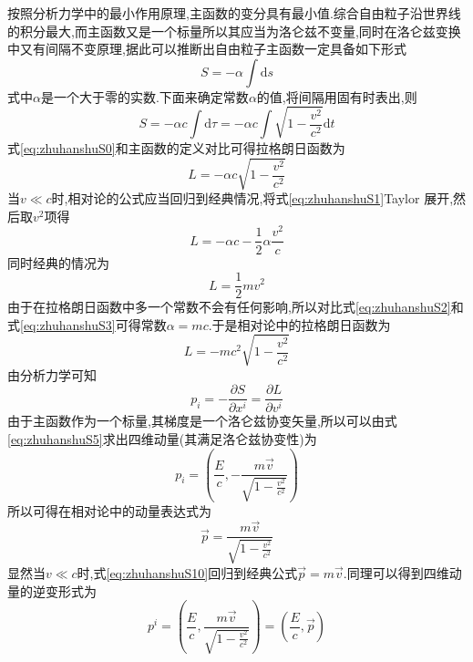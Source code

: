 按照分析力学中的最小作用原理,主函数的变分具有最小值.综合自由粒子沿世界线的积分最大,而主函数又是一个标量所以其应当为洛仑兹不变量,同时在洛仑兹变换中又有间隔不变原理,据此可以推断出自由粒子主函数一定具备如下形式
\begin{equation}
  S=-\alpha \int \mathrm{d}s
  \label{eq:zhuhanshuS}
\end{equation}
式中$\alpha$是一个大于零的实数.下面来确定常数$\alpha$的值,将间隔用固有时表出,则
\begin{equation}
  S=-\alpha c \int \mathrm{d}\tau =-\alpha c \int \sqrt{1-\frac{v^2}{c^2}} \mathrm{d}t
  \label{eq:zhuhanshuS0}
\end{equation}
式\eqref{eq:zhuhanshuS0}和主函数的定义对比可得拉格朗日函数为
\begin{equation}
  L=-\alpha c \sqrt{1-\frac{v^2}{c^2}}
  \label{eq:zhuhanshuS1}
\end{equation}
当$v \ll c$时,相对论的公式应当回归到经典情况,将式\eqref{eq:zhuhanshuS1}Taylor 展开,然后取$v^2$项得
\begin{equation}
  L=-\alpha c -\frac{1}{2}\alpha \frac{v^2}{c}
  \label{eq:zhuhanshuS2}
\end{equation}
同时经典的情况为
\begin{equation}
  L=\frac{1}{2}mv^2
  \label{eq:zhuhanshuS3}
\end{equation}
由于在拉格朗日函数中多一个常数不会有任何影响,所以对比式\eqref{eq:zhuhanshuS2}和式\eqref{eq:zhuhanshuS3}可得常数$\alpha =  mc$.于是相对论中的拉格朗日函数为
\begin{equation}
  L=-mc^2\sqrt{1-\frac{v^2}{c^2}}
  \label{eq:zhuhanshuS4}
\end{equation}
由分析力学可知
\begin{equation}
  p_i =-\frac{\partial S}{\partial x^i}=\frac{\partial L}{\partial v^i}
  \label{eq:zhuhanshuS5}
\end{equation}
由于主函数作为一个标量,其梯度是一个洛仑兹协变矢量,所以可以由式\eqref{eq:zhuhanshuS5}求出四维动量(其满足洛仑兹协变性)为
\begin{equation}
  p_i=\left (\frac{E}{c},-\frac{m\vec{v}}{\sqrt{1-\frac{v^2}{c^2}}}\right )
  \label{eq:zhuhanshuS6}
\end{equation}
所以可得在相对论中的动量表达式为
\begin{equation}
  \vec{p}=\frac{m\vec{v}}{\sqrt{1-\frac{v^2}{c^2}}}
  \label{eq:zhuhanshuS10}
\end{equation}
显然当$v\ll c$时,式\eqref{eq:zhuhanshuS10}回归到经典公式$\vec{p}=m\vec{v}$.同理可以得到四维动量的逆变形式为
\begin{equation}
  p^i=\left (\frac{E}{c},\frac{m\vec{v}}{\sqrt{1-\frac{v^2}{c^2}}}\right )
  =\left(\frac{E}{c},\vec{p}\right)
  \label{eq:zhuhanshuS11}
\end{equation}
